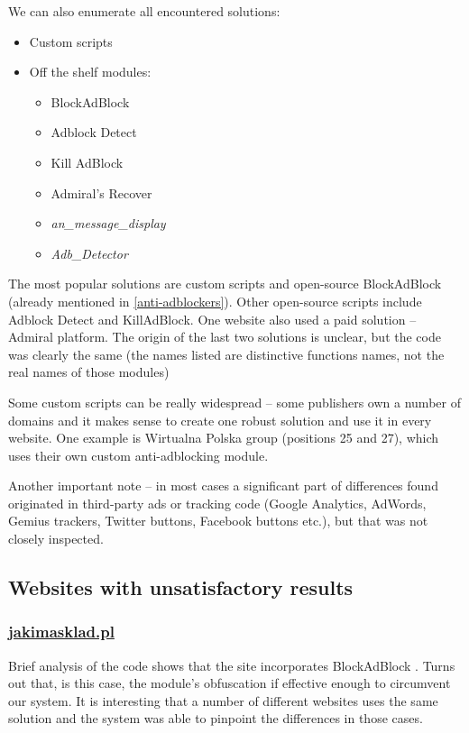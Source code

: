 We can also enumerate all encountered solutions:
\begin{itemize}
  \item Custom scripts
  \item Off the shelf modules:
    \begin{itemize}
      \item BlockAdBlock \cite{github:blockadblock}
      \item Adblock Detect \cite{adblock-detect}
      \item Kill AdBlock \cite{kill-adblock}
      \item Admiral's Recover \cite{admiral:recover}
      \item \emph{an\_message\_display}
      \item \emph{Adb\_Detector}
    \end{itemize}
\end{itemize}

The most popular solutions are custom scripts and open-source BlockAdBlock (already mentioned in \ref{anti-adblockers}).
Other open-source scripts include Adblock Detect and KillAdBlock. One website also used a paid solution -- Admiral platform.
The origin of the last two solutions is unclear, but the code was clearly the same (the names listed are 
distinctive functions names, not the real names of those modules)

Some custom scripts can be really widespread -- some publishers own a number of domains and it makes 
sense to create one robust solution and use it in every website. One example is Wirtualna Polska group (positions 25 and 27), 
which uses their own custom anti-adblocking module.

Another important note -- in most cases a significant part of differences found originated in third-party ads
or tracking code (Google Analytics, AdWords, Gemius trackers, Twitter buttons, Facebook buttons etc.),
but that was not closely inspected.


\subsection{Websites with unsatisfactory results}

\subsubsection{\url{jakimasklad.pl}}
Brief analysis of the code shows that the site incorporates BlockAdBlock \cite{github:blockadblock}. 
Turns out that, is this case, the module's obfuscation if effective enough to circumvent our system.
It is interesting that a number of different websites uses the same solution and the system
was able to pinpoint the differences in those cases.

